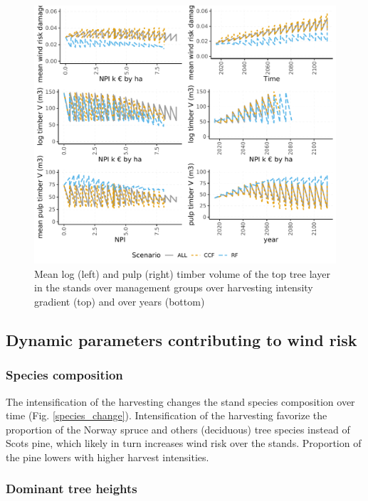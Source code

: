 \documentclass[]{elsarticle} %
\makeatletter
\def\maxwidth{\ifdim\Gin@nat@width>\linewidth\linewidth
\else\Gin@nat@width\fi}
\let\Oldincludegraphics\includegraphics
\renewcommand{\includegraphics}[1]{\Oldincludegraphics[width=\maxwidth]{#1}}
\makeatother
\begin{document}
\begin{figure}
\centering
\includegraphics{test_manus3_files/figure-latex/show-plot-volume-1.pdf}
\caption{\label{fig:show-plot-volume}Mean log (left) and pulp (right) timber volume of the top tree layer in the stands over management groups over harvesting intensity gradient (top) and over years (bottom)}
\end{figure}

\hypertarget{dynamic-parameters-contributing-to-wind-risk}{%
\subsection{Dynamic parameters contributing to wind risk}\label{dynamic-parameters-contributing-to-wind-risk}}

\hypertarget{species-composition}{%
\subsubsection{Species composition}\label{species-composition}}

The intensification of the harvesting changes the stand species composition over time (Fig. \ref{species_change}). Intensification of the harvesting favorize the proportion of the Norway spruce and others (deciduous) tree species instead of Scots pine, which likely in turn increases wind risk over the stands. Proportion of the pine lowers with higher harvest intensities.

\hypertarget{dominant-tree-heights}{%
\subsubsection{Dominant tree heights}\label{dominant-tree-heights}}
\end{document}
